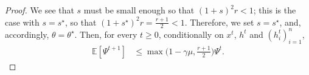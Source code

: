 \documentclass{article} %
\theoremstyle{plain}
\theoremstyle{definition}
\theoremstyle{remark}
\newcommand{\Exp}[1]{\mathbb{E}\!\left[ #1 \right]}
\begin{document}
\begin{proof}
   We see that $s$ must be small enough so that $(1+s)^2 r <1$; this is the case with 
   $s=s^\star$, so that $(1+s^\star)^2 r = \frac{r+1}{2}<1$. 
   Therefore, we set $s=s^\star$, and, accordingly, $\theta=\theta^\star$. Then, for every $t\geq 0$,
   conditionally on $x^t$, $h^t$ and $(h_i^t)_{i=1}^n$,
   \begin{align*}
   \Exp{\Psi^{t+1}} 
   &\leq \max\big(1-\gamma\mu, {\frac{r+1}{2}}\big) \Psi^t.
   \end{align*}

   \end{proof}
\end{document}
